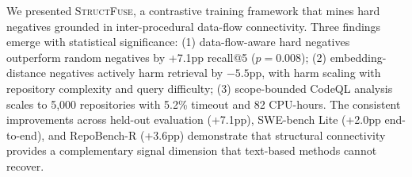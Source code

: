 \documentclass[11pt]{article}
\begin{document}
We presented \textsc{StructFuse}, a contrastive training framework that mines hard negatives grounded in inter-procedural data-flow connectivity.
Three findings emerge with statistical significance:
(1) data-flow-aware hard negatives outperform random negatives by +7.1pp recall@5 ($p{=}0.008$);
(2) embedding-distance negatives actively harm retrieval by $-5.5$pp, with harm scaling with repository complexity and query difficulty;
(3) scope-bounded CodeQL analysis scales to 5{,}000 repositories with 5.2\% timeout and 82 CPU-hours.
The consistent improvements across held-out evaluation (+7.1pp), SWE-bench Lite (+2.0pp end-to-end), and RepoBench-R (+3.6pp) demonstrate that structural connectivity provides a complementary signal dimension that text-based methods cannot recover.



\end{document}
